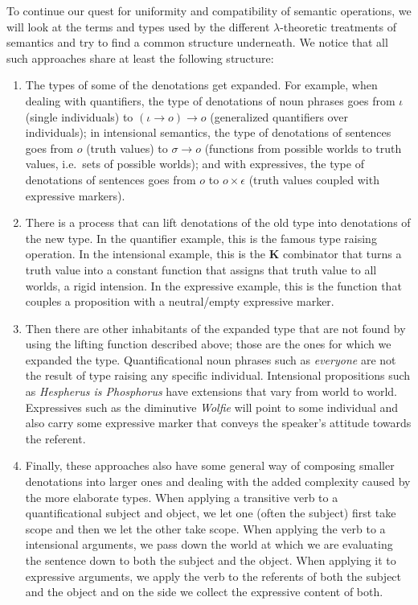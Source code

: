 To continue our quest for uniformity and compatibility of semantic
operations, we will look at the terms and types used by the different
$\lambda$-theoretic treatments of semantics and try to find a common
structure underneath. We notice that all such approaches share at least the
following structure:

\begin{enumerate}
\item \label{item:type-transformation} The types of some of the denotations
  get expanded. For example, when dealing with quantifiers, the type of
  denotations of noun phrases goes from $\iota$ (single individuals) to
  $(\iota \to o) \to o$ (generalized quantifiers over individuals); in
  intensional semantics, the type of denotations of sentences goes from $o$
  (truth values) to $\sigma \to o$ (functions from possible worlds to truth
  values, i.e.\ sets of possible worlds); and with expressives, the type of
  denotations of sentences goes from $o$ to $o \times \epsilon$ (truth
  values coupled with expressive markers).
\item \label{item:monad-eta} There is a process that can lift denotations
  of the old type into denotations of the new type. In the quantifier
  example, this is the famous type raising operation. In the intensional
  example, this is the $\textbf{K}$ combinator that turns a truth value
  into a constant function that assigns that truth value to all worlds, a
  rigid intension. In the expressive example, this is the function that
  couples a proposition with a neutral/empty expressive marker.
\item Then there are other inhabitants of the expanded type that are not
  found by using the lifting function described above; those are the ones
  for which we expanded the type. Quantificational noun phrases such as
  \emph{everyone} are not the result of type raising any specific
  individual. Intensional propositions such as \emph{Hespherus is
    Phosphorus} have extensions that vary from world to world. Expressives
  such as the diminutive \emph{Wolfie} will point to some individual and
  also carry some expressive marker that conveys the speaker's attitude
  towards the referent.
\item \label{item:monad-mu} Finally, these approaches also have some
  general way of composing smaller denotations into larger ones and dealing
  with the added complexity caused by the more elaborate types. When
  applying a transitive verb to a quantificational subject and object, we
  let one (often the subject) first take scope and then we let the other
  take scope. When applying the verb to a intensional arguments, we pass
  down the world at which we are evaluating the sentence down to both the
  subject and the object. When applying it to expressive arguments, we
  apply the verb to the referents of both the subject and the object and on
  the side we collect the expressive content of both.
\end{enumerate}

